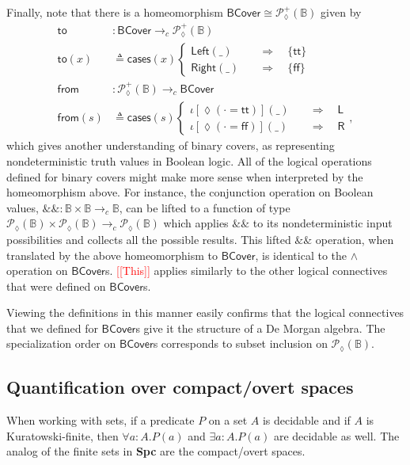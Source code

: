 \documentclass[conference]{IEEEtran}
\newcommand{\PLower}{\mathcal{P}_\lozenge}
\newcommand{\cto}{\to_c}
\newcommand{\bool}{\mathbb{B}}
\newcommand{\wildcard}{\_}
\newcommand{\oinclf}[1]{\iota[{#1}]}
\newcommand{\oincl}[2]{\oinclf{#1} \left({#2}\right)}
\newcommand{\Branch}{\Rightarrow}
\newcommand{\note}[1]{\textcolor{red}{[[{#1}]]}}
\begin{document}
Finally, note that there is a homeomorphism $\mathsf{BCover} \cong \PLower^+(\bool)$ given by
\begin{align*}
\mathsf{to} &: \mathsf{BCover} \cto \PLower^+(\bool)
\\ \mathsf{to}(x) &\triangleq
  \mathsf{cases}(x)
  \begin{cases}
\mathsf{Left}(\wildcard)
 \quad &\Branch \quad
 \{ \mathsf{tt} \}
\\
\mathsf{Right}(\wildcard)
 \quad &\Branch \quad
 \{ \mathsf{ff} \}
  \end{cases}
\\
\mathsf{from} &: \PLower^+(\bool) \cto \mathsf{BCover}
\\ \mathsf{from}(s) &\triangleq
  \mathsf{cases}(s)
  \begin{cases}
 \oincl{\lozenge(\cdot = \mathsf{tt})}{\wildcard}
 \quad &\Branch \quad
 \mathsf{L}
\\
 \oincl{\lozenge(\cdot = \mathsf{ff})}{\wildcard}
 \quad &\Branch \quad
 \mathsf{R}
  \end{cases},
\end{align*}
which gives another understanding of binary covers, as representing nondeterministic truth values in Boolean logic. All of the logical operations defined for binary covers might make more sense when interpreted by the homeomorphism above. For instance, the conjunction operation on Boolean values,
$\&\& : \bool \times \bool \cto \bool$, can be lifted to a function of type $\PLower(\bool) \times \PLower(\bool) \cto \PLower(\bool)$ which applies $\&\&$ to its nondeterministic input possibilities and collects all the possible results. This lifted $\&\&$ operation, when translated by the above homeomorphism to $\mathsf{BCover}$, is identical to the $\wedge$ operation on $\mathsf{BCover}$s. \note{This} applies similarly to the other logical connectives that were defined on $\mathsf{BCover}$s.

Viewing the definitions in this manner easily confirms that the logical connectives that we defined for $\mathsf{BCover}$s give it the structure of a De Morgan algebra.
The specialization order on $\mathsf{BCover}$s corresponds to subset inclusion on $\PLower(\bool)$.

\subsection{Quantification over compact/overt spaces}

When working with sets, if a predicate $P$ on a set $A$ is decidable and if $A$ is Kuratowski-finite, then $\forall a : A. P(a)$ and $\exists a : A. P(a)$ are decidable as well. The analog of the finite sets in \textbf{Spc} are the compact/overt spaces.
\end{document}
